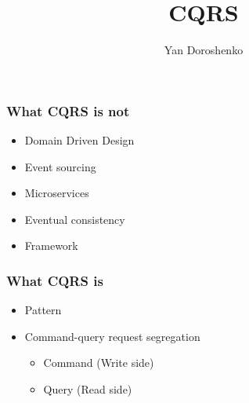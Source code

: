 \documentclass{beamer}
\title[CQRS]{CQRS}
\author[Yan Doroshenko]{Yan Doroshenko}
\begin{document}
\frame{\titlepage}

\begin{frame}
\frametitle{What CQRS is not}

\begin{itemize}[<+->]
  \item Domain Driven Design
  \item Event sourcing
  \item Microservices
  \item Eventual consistency
  \item Framework
\end{itemize}

\end{frame}

\begin{frame}
\frametitle{What CQRS is}

\begin{itemize}
  \item<1-> Pattern
  \item<2-> Command-query request segregation

    \begin{itemize}
      \item<3-> Command (Write side)



      \item<4-> Query (Read side)

        \rule{0pt}{10pt}


    \end{itemize}
\end{itemize}

\end{frame}
\end{document}
